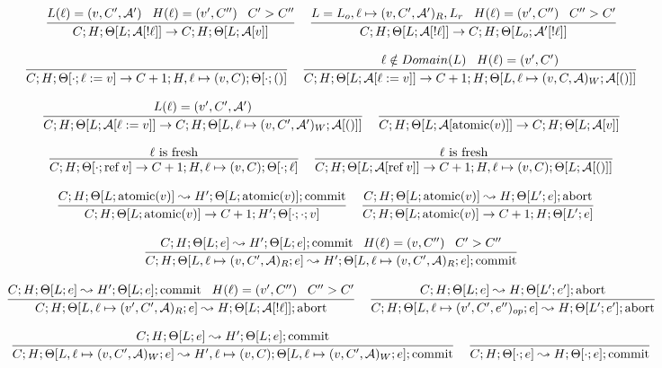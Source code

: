 \documentclass[9pt]{article}
\newcommand{\aeval}[1]{\mathcal{A}[#1]}
\newcommand{\actxt}[0]{\mathcal{A}}
\newcommand{\loc}[0]{\ell}
\newcommand{\atomic}[1]{\text{atomic}(#1)}
\newcommand{\alloc}[1]{\text{ref} \; #1}
\newcommand{\commit}[0]{\text{commit}}
\newcommand{\abort}[0]{\text{abort}}
\begin{document}
\[%
\infer[]{C; H; \Theta[L; \aeval{!\loc}] \rightarrow C; H; \Theta[L; \aeval{v}]}{L(\loc) = (v, C', \actxt') \;\;\; H(\loc) = (v', C'') \;\;\; C' > C''} \;\;\;
\infer[]{C; H; \Theta[L; \aeval{!\loc}] \rightarrow C; H; \Theta[L_o; \actxt'[!\loc]]}{L = L_o, \loc \mapsto (v, C', \actxt')_R, L_r  \;\;\; H(\loc) = (v', C'') \;\;\; C'' > C'} 
\]

\[%
\infer[]{C; H; \Theta[\cdot; \loc := v] \rightarrow C+1; H, \loc \mapsto (v, C); \Theta[\cdot; ()]}{}\;\;\;
\infer[]{C; H; \Theta[L; \aeval{\loc := v}] \rightarrow C+1; H; \Theta[L, \loc \mapsto (v, C, \actxt)_W; \aeval{()}]}{\loc \notin Domain(L) \;\;\; H(\loc) = (v', C')} 
\]

\[%
\infer[]{C; H; \Theta[L; \aeval{\loc := v}] \rightarrow C; H; \Theta[L, \loc \mapsto (v, C', \actxt')_W; \aeval{()}]}{L(\loc) =  (v', C', \actxt')} \;\;\;
\infer[]{C; H; \Theta[L; \aeval{\atomic{v}}] \rightarrow C; H; \Theta[L; \aeval{v}]}{}
\]

\[%
\infer[]{C; H; \Theta[\cdot; \alloc{v}] \rightarrow C+1; H, \loc \mapsto (v, C); \Theta[\cdot; \loc]}{\loc \text{ is fresh}} \;\;\;
\infer[]{C; H; \Theta[L; \aeval{\alloc{v}}] \rightarrow C+1; H, \loc \mapsto (v, C); \Theta[L;  \aeval{()}]}{\loc \text{ is fresh}}
\]

\[%
\infer[]{C; H; \Theta[L; \atomic{v}] \rightarrow C+1; H'; \Theta[\cdot;\cdot; v]}{C; H; \Theta[L; \atomic{v}] \leadsto H'; \Theta[L; \atomic{v}]; \commit} \;\;\;
\infer[]{C; H; \Theta[L; \atomic{v}] \rightarrow C+1; H; \Theta[L'; e]}{C; H; \Theta[L; \atomic{v}] \leadsto H; \Theta[L'; e]; \abort} \;\;\;
\]

\boxed{C; H; \Theta[L; e] \leadsto H', \Theta[L'; e']; (\abort | \commit)}

\[%
\infer[]{C; H; \Theta[L, \loc \mapsto (v, C', \actxt)_R; e] \leadsto H'; \Theta[L, \loc \mapsto (v, C', \actxt)_R;e]; \commit}{C; H; \Theta[L; e] \leadsto H'; \Theta[L; e]; \commit \;\;\; H(\loc) = (v, C'') \;\;\; C' > C''} 
\]

\[%
\infer[]{C; H; \Theta[L, \loc \mapsto (v', C',\actxt)_R; e] \leadsto H; \Theta[L; \aeval{!\loc}]; \abort}{C; H; \Theta[L; e] \leadsto H'; \Theta[L; e]; \commit \;\;\; H(\loc) = (v', C'') \;\;\; C'' > C'} \;\;\;
\infer[]{C; H; \Theta[L, \loc \mapsto (v', C',e'')_{op}; e] \leadsto H; \Theta[L'; e']; \abort}{C; H; \Theta[L; e] \leadsto H; \Theta[L'; e']; \abort} 
\]

\[%
\infer[]{C; H; \Theta[L, \loc \mapsto (v, C', \actxt)_W; e] \leadsto H', \loc \mapsto (v, C); \Theta[L, \loc \mapsto (v, C', \actxt)_W; e]; \commit}{C; H; \Theta[L; e] \leadsto H'; \Theta[L; e]; \commit} \;\;\;
\infer[]{C;H;\Theta[\cdot;e] \leadsto H; \Theta[\cdot;e]; \commit}{}
\]

\endgroup
\end{document}
